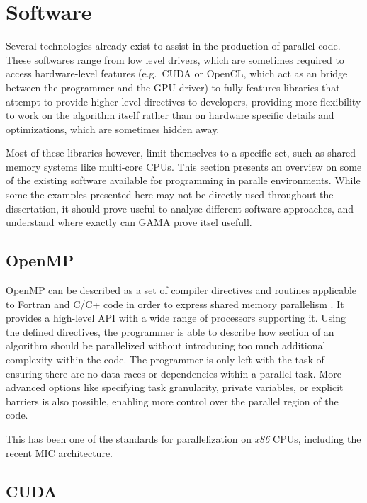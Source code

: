 \documentclass[main.tex]{subfiles}
\begin{document}
\section{Software}

Several technologies already exist to assist in the production of parallel code. These softwares range from low level drivers, which are sometimes required to access hardware-level features (e.g.\ \acs{CUDA} or \acs{OpenCL}, which act as an bridge between the programmer and the \acs{GPU} driver) to fully features libraries that attempt to provide higher level directives to developers, providing more flexibility to work on the algorithm itself rather than on hardware specific details and optimizations, which are sometimes hidden away.

Most of these libraries however, limit themselves to a specific set, such as shared memory systems like multi-core \acsp{CPU}. This section presents an overview on some of the existing software available for programming in paralle environments. While some the examples presented here may not be directly used throughout the dissertation, it should prove useful to analyse different software approaches, and understand where exactly can \acs{GAMA} prove itsel usefull.


\subsection{\acs{OpenMP}}

\ac{OpenMP} can be described as a set of compiler directives and routines applicable to Fortran and C/C+ code in order to express shared memory parallelism \cite{dagum1998openmp}. It provides a high-level API with a wide range of processors supporting it.
Using the defined directives, the programmer is able to describe how section of an algorithm should be parallelized without introducing too much additional complexity within the code. The programmer is only left with the task of ensuring there are no data races or dependencies within a parallel task. More advanced options like specifying task granularity, private variables, or explicit barriers is also possible, enabling more control over the parallel region of the code.

This has been one of the standards for parallelization on \textit{x86} \acsp{CPU}, including the recent \intel \acf{MIC} architecture.


\subsection{\acs{CUDA}}
\end{document}
